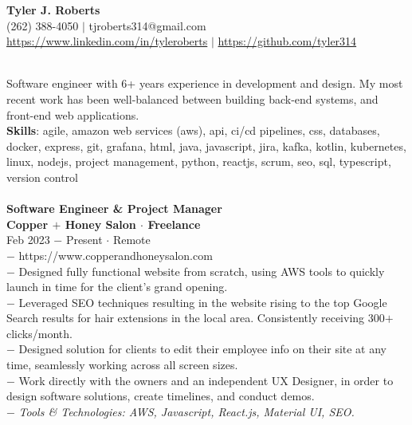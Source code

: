 \documentclass{resume}
\begin{document}
\begin{center}
{\LARGE \bf Tyler J. Roberts} \\[1mm]
\footnotesize
(262) 388-4050 $|$
tjroberts314@gmail.com \\[1mm]
\href{https://www.linkedin.com/in/tyleroberts}{https://www.linkedin.com/in/tyleroberts} $|$
\href{https://github.com/tyler314}{https://github.com/tyler314}
\end{center}
\begin{flushleft}

 \\[2mm]
{
\scriptsize
\tab Software engineer with 6+ years experience in  development and design. My most recent work has been well-balanced between building back-end systems, and front-end  web applications.\\[2mm]
\scriptsize
\textbf{Skills}: agile, amazon web services (aws), api, ci/cd pipelines, css, databases, docker, express, git, grafana, html, java, javascript, jira, kafka, kotlin, kubernetes, linux, nodejs, project management, python, reactjs, scrum, seo, sql, typescript, version control
\\[2mm]
}
\\[2mm]

\normalsize{\bf Software Engineer \& Project Manager}\\
\footnotesize{\bf Copper $+$ Honey Salon $\cdot$ Freelance}\\
\footnotesize{Feb 2023 $-$ Present $\cdot$ Remote}\\[1mm]
{\scriptsize
	$-$ https://www.copperandhoneysalon.com\\
	$-$ Designed fully functional website from scratch, using AWS tools to quickly launch in time for the client's grand opening.\\
	$-$ Leveraged SEO techniques resulting in the website rising to the top Google Search results for hair extensions in the local area. Consistently receiving 300$+$ clicks/month.\\
	$-$ Designed solution for clients to edit their employee info on their site at any time, seamlessly working across all screen sizes.\\
	$-$ Work directly with the owners and an independent UX Designer, in order to design software solutions, create timelines, and conduct demos.\\
	$-$ \textit{Tools \& Technologies: AWS, Javascript, React.js, Material UI, SEO.}
}\\[3mm]


\end{flushleft}
\end{document}
